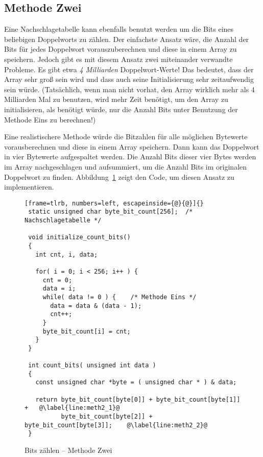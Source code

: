\subsection{Methode Zwei}

Eine Nachschlagetabelle kann ebenfalls benutzt werden um die Bits
eines beliebigen Doppelworts zu z\"{a}hlen. Der einfachste Ansatz w\"{a}re,
die Anzahl der Bits f\"{u}r jedes Doppelwort vorauszuberechnen und diese
in einem Array zu speichern. Jedoch gibt es mit diesem Ansatz zwei
miteinander verwandte Probleme. Es gibt etwa \emph{4 Milliarden}
Doppelwort-Werte! Das bedeutet, dass der Array sehr gro{\ss} sein wird
und dass auch seine Initialisierung sehr zeitaufwendig sein w\"{u}rde.
(Tats\"{a}chlich, wenn man nicht vorhat, den Array wirklich mehr als 4
Milliarden Mal zu benutzen, wird mehr Zeit ben\"{o}tigt, um den Array zu
initialisieren, als ben\"{o}tigt w\"{u}rde, nur die Anzahl Bits unter
Benutzung der Methode Eins zu berechnen!)

Eine realistischere Methode w\"{u}rde die Bitzahlen f\"{u}r alle m\"{o}glichen
Bytewerte vorausberechnen und diese in einem Array speichern. Dann
kann das Doppelwort in vier Bytewerte aufgespaltet werden. Die
Anzahl Bits dieser vier Bytes werden im Array nachgeschlagen und
aufsummiert, um die Anzahl Bits im originalen Doppelwort zu finden.
Abbildung~\ref{fig:meth2} zeigt den Code, um diesen Ansatz zu
implementieren.

\begin{figure}[ht]
\begin{lstlisting}[frame=tlrb, numbers=left, escapeinside={@}{@}]{}
 static unsigned char byte_bit_count[256];  /* Nachschlagetabelle */

 void initialize_count_bits()
 {
   int cnt, i, data;

   for( i = 0; i < 256; i++ ) {
     cnt = 0;
     data = i;
     while( data != 0 ) {    /* Methode Eins */
       data = data & (data - 1);
       cnt++;
     }
     byte_bit_count[i] = cnt;
   }
 }

 int count_bits( unsigned int data )
 {
   const unsigned char *byte = ( unsigned char * ) & data;

   return byte_bit_count[byte[0]] + byte_bit_count[byte[1]] +   @\label{line:meth2_1}@
          byte_bit_count[byte[2]] + byte_bit_count[byte[3]];    @\label{line:meth2_2}@
 }
\end{lstlisting}
\caption{Bits z\"{a}hlen -- Methode Zwei \label{fig:meth2}}
\end{figure}

